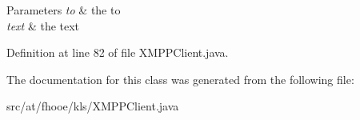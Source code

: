\begin{DoxyParams}{Parameters}
{\em to} & the to \\
\hline
{\em text} & the text \\
\hline
\end{DoxyParams}


Definition at line 82 of file X\-M\-P\-P\-Client.\-java.



The documentation for this class was generated from the following file\-:\begin{DoxyCompactItemize}
\item 
src/at/fhooe/kls/X\-M\-P\-P\-Client.\-java\end{DoxyCompactItemize}
